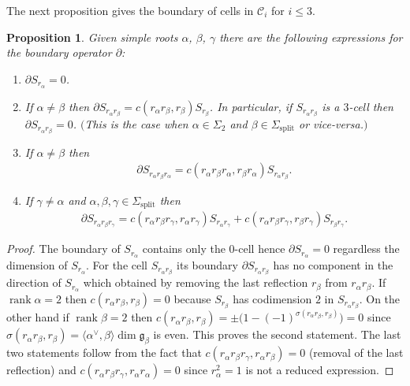 \documentclass[10pt,a4paper]{amsart}
\numberwithin{equation}{section}
\newtheorem{Proposition}[Theorem]{Proposition}
 { \theoremstyle{definition}
\newtheorem{Definition}[Theorem]{Definition}
\newtheorem{Note}[Theorem]{Note}
\newtheorem{Example}[Theorem]{Example}
\newtheorem{Remark}[Theorem]{Remark} }
\begin{document}
The next proposition gives the boundary of cells in $\mathcal C_i$ for $i\leq 3$.
\begin{Proposition}\label{pro.boundarymax}Given simple roots $\alpha$, $\beta$, $\gamma $ there are the following expressions for the boundary operator $\partial $:
\begin{enumerate}\itemsep=0pt
\item[$1.$] $\partial S_{r_{\alpha }}=0$.
\item[$2.$] If $\alpha \neq \beta $ then $\partial S_{r_{\alpha }r_{\beta }}=c( r_{\alpha }r_{\beta },r_{\beta}) S_{r_{\beta }}$. In particular, if $S_{r_{\alpha }r_{\beta }}$ is a $3$-cell then $\partial S_{r_{\alpha}r_{\beta }}=0$. $($This is the case when $\alpha \in \Sigma _{2}$ and $\beta\in \Sigma _{\mathrm{split}}$ or vice-versa.$)$
\item[$3.$] If $\alpha \neq \beta $ then
\begin{gather}
\partial S_{r_{\alpha }r_{\beta }r_{\alpha }}=c ( r_{\alpha }r_{\beta}r_{\alpha },r_{\beta }r_{\alpha } ) S_{r_{\alpha }r_{\beta }}.\label{eq.deltaSa}
\end{gather}
\item[$4.$] If $\gamma \neq \alpha $ and $\alpha,\beta,\gamma \in \Sigma _{\mathrm{split}}$ then
\begin{gather}
\partial S_{r_{\alpha }r_{\beta }r_{\gamma }}=c ( r_{\alpha }r_{\beta}r_{\gamma },r_{\alpha }r_{\gamma } ) S_{r_{\alpha }r_{\gamma}}+c ( r_{\alpha }r_{\beta }r_{\gamma },r_{\beta }r_{\gamma } )S_{r_{\beta }r_{\gamma }}. \label{eq.deltaSaba}
\end{gather}
\end{enumerate}
\end{Proposition}

\begin{proof}The boundary of $S_{r_{\alpha }}$ contains only the $0$-cell hence $\partial S_{r_{\alpha }}=0$ regardless the dimension of $S_{r_{\alpha }}$. For the cell $S_{r_{\alpha }r_{\beta }}$ its boundary $\partial S_{r_{\alpha}r_{\beta }}$ has no component in the direction of $S_{r_{\alpha }}$ which obtained by removing the last reflection $r_{\beta }$ from $r_{\alpha}r_{\beta }$. If $\operatorname{rank}\alpha =2$ then $c( r_{\alpha}r_{\beta },r_{\beta }) =0$ because $S_{r_{\beta }}$ has codimension $2 $ in $S_{r_{\alpha }r_{\beta }}$. On the other hand if $\operatorname{rank} \beta =2$ then $c(r_{\alpha }r_{\beta },r_{\beta })=\pm \big( 1-(-1) ^{\sigma ( r_{\alpha }r_{\beta },r_{\beta } ) }\big)=0 $ since $\sigma ( r_{\alpha }r_{\beta },r_{\beta }) =\langle \alpha^\vee,\beta \rangle\dim \mathfrak{g}_{\beta }$ is even. This proves the second statement. The last two statements follow from the fact that $c( r_{\alpha }r_{\beta }r_{\gamma },r_{\alpha }r_{\beta })=0$ (removal of the last reflection) and $c( r_{\alpha }r_{\beta}r_{\gamma },r_{\alpha }r_{\alpha }) =0$ since $r_{\alpha }^{2}=1$ is not a reduced expression.
\end{proof}
\end{document}
